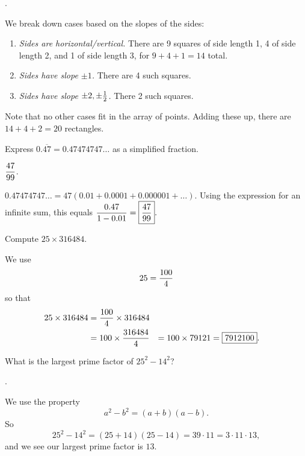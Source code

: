 \documentclass[11pt]{article}
\DeclareRobustCommand{\frac}[3][0pt]{%
  {\begingroup\hspace{#1}#2\hspace{#1}\endgroup\over\hspace{#1}#3\hspace{#1}}}
\begin{document}
.
\begin{solution}
We break down cases based on the slopes of the sides:
\begin{enumerate}
\item \emph{Sides are horizontal/vertical.} There are 9 squares of side length 1, 4 of side length 2, and 1 of side length 3, for $9 + 4 + 1 = 14$ total.
\item \emph{Sides have slope $\pm 1$.} There are 4 such squares.
\item \emph{Sides have slope $\pm 2, \pm \frac{1}{2}$.} There 2 such squares.
\end{enumerate}
Note that no other cases fit in the array of points. Adding these up, there are $14 + 4 + 2 = \boxed{20}$ rectangles.
\end{solution}

\begin{problem}Express $0.\overline{47} = 0.47474747\ldots$ as a simplified fraction.
\end{problem}

\answer $\displaystyle \frac{47}{99}$.

\begin{solution}
$\displaystyle 0.47474747\ldots = 47(0.01 + 0.0001 + 0.000001 + \ldots)$. Using the expression for an infinite sum, this equals $\displaystyle \frac{0.47}{1 - 0.01} = \boxed{\frac{47}{99}}.$
\end{solution}


\begin{problem}Compute $25 \times 316484$.
\end{problem}
\begin{answer}
\end{answer}
\begin{solution}
We use 
$$25 = \frac{100}{4}$$
so that
\begin{align*}
25 \times 316484 &= \frac{100}{4} \times 316484 \\
&= 100 \times \frac{316484}{4}
&= 100 \times 79121
&= \boxed{7912100}.
\end{align*}
\end{solution}

\begin{problem}What is the largest prime factor of $25^2-14^2$?
\end{problem}
\begin{answer}
.
\end{answer}
\begin{solution}
We use the property 
$$a^2-b^2 = (a+b)(a-b).$$
So 
$$25^2-14^2 = (25+14)(25-14) = 39 \cdot 11 = 3 \cdot 11 \cdot 13,$$
and we see our largest prime factor is $\boxed{13}$.

\end{solution}
\end{document}
